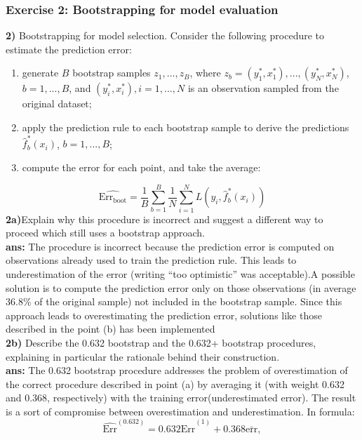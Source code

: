 \documentclass[a4paper, norsk, 8pt]{article}
\begin{document}
\begin{multicols*}{2}
\subsubsection*{\scriptsize Exercise 2: Bootstrapping for model evaluation}
\textbf{2)} Bootstrapping for model selection. Consider the following procedure to estimate the prediction error:
\begin{enumerate}
	\item generate $B$ bootstrap samples $z_1,...,z_B$, where $z_b={(y^*_1,x^*_1),...,(y^*_N,x^*_N)}$, $b= 1,...,B$, and $(y^*_i,x^*_i),i= 1,...,N$ is an observation sampled from the original dataset;
	\item apply the prediction rule to each bootstrap sample to derive the predictions $\hat{f}^*_b(x_i)$, $b= 1,...,B$;
	\item compute the error for each point, and take the average:
\end{enumerate}
\begin{equation}
	\hat{\text{Err}_{\text{boot}}} = \frac1B\sum^B_{b=1}\frac1N \sum^N_{i=1}L(y_i,\hat{f}^*_b(x_i))
\end{equation}
\textbf{2a)}Explain why this procedure is incorrect and suggest a different way to proceed which still uses a bootstrap approach.\\
\textbf{ans:} The procedure is incorrect because the prediction error is computed on observations already used to train the prediction rule. This leads to underestimation of the error (writing “too optimistic” was acceptable).A possible solution is to compute the prediction error only on those observations (in average $36.8\%$ of the original sample) not included in the bootstrap sample. Since this approach leads to overestimating the prediction error, solutions like those described in the point (b) has been implemented\\
\textbf{2b)} Describe the 0.632 bootstrap and the 0.632+ bootstrap procedures, explaining in particular the rationale behind their construction.\\
\textbf{ans:} The 0.632 bootstrap procedure addresses the problem of overestimation of the correct procedure described in point (a) by averaging it (with weight 0.632 and 0.368, respectively) with the training error(underestimated error). The result is a sort of compromise between overestimation and underestimation. In formula:
\begin{equation}
	\hat{\text{Err}}^{(0.632)} = 0.632 \hat{\text{Err}}^{(1)} + 0.368 \bar{\text{err}},
\end{equation}

\end{multicols*}
\end{document}
